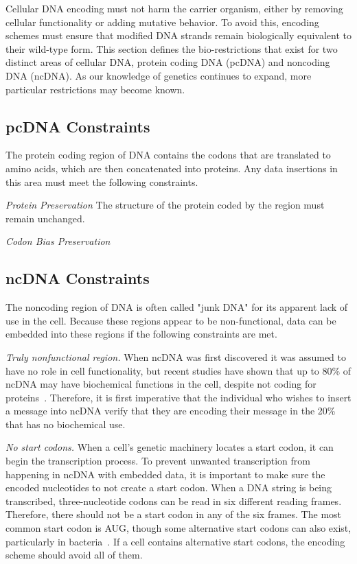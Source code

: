 \documentclass[USenglish,oneside,twocolumn]{article}
\begin{document}
Cellular DNA encoding must not harm the carrier organism, either by removing cellular functionality or adding mutative behavior. To avoid this, encoding schemes must ensure that modified DNA strands remain biologically equivalent to their wild-type form. This section defines the bio-restrictions that exist for two distinct areas of cellular DNA, protein coding DNA (pcDNA) and noncoding DNA (ncDNA). As our knowledge of genetics continues to expand, more particular restrictions may become known.

\subsection{pcDNA Constraints}

The protein coding region of DNA contains the codons that are translated to amino acids, which are then concatenated into proteins. Any data insertions in this area must meet the following constraints.

\textit{Protein Preservation} The structure of the protein coded by the region must remain unchanged.

\textit{Codon Bias Preservation}


\subsection{ncDNA Constraints}

The noncoding region of DNA is often called "junk DNA" for its apparent lack of use in the cell. Because these regions appear to be non-functional, data can be embedded into these regions if the following constraints are met.

\textit{Truly nonfunctional region.} When ncDNA was first discovered it was assumed to have no role in cell functionality, but recent studies have shown that up to 80\% of ncDNA may have biochemical functions in the cell, despite not coding for proteins~\cite{EPC2012N}. Therefore, it is first imperative that the individual who wishes to insert a message into ncDNA verify that they are encoding their message in the 20\% that has no biochemical use.

\textit{No start codons.} When a cell's genetic machinery locates a start codon, it can begin the transcription process. To prevent unwanted transcription from happening in ncDNA with embedded data, it is important to make sure the encoded nucleotides to not create a start codon. When a DNA string is being transcribed, three-nucleotide codons can be read in six different reading frames. Therefore, there should not be a start codon in any of the six frames. The most common start codon is AUG, though some alternative start codons can also exist, particularly in bacteria~\cite{B1997S}. If a cell contains alternative start codons, the encoding scheme should avoid all of them.
\end{document}

